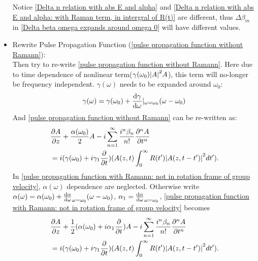 \documentclass[12pt]{extarticle}
\numberwithin{equation}{section}
\numberwithin{figure}{section}
\numberwithin{table}{section}
\newcommand{\<}{\langle}
\renewcommand{\>}{\rangle}
\theoremstyle{definition}
\begin{document}
\begin{itemize}
\begin{equation}
                \end{equation}
                Notice \autoref{Delta n relation with abs E and alpha} and \autoref{Delta n relation with abs E and alpha: with Raman term, in intergral of R(t)} are different, thus $\Delta \beta_m$ in \autoref{Delta beta omega expands around omega 0} will have different values.
            \item Rewrite Pulse Propagation Function (\autoref{pulse propagation function without Ramann}):\\
                Then try to re-write \autoref{pulse propagation function without Ramann}. Here due to time dependence of nonlinear term($\gamma (\omega_0) \abs{A}^2A$), this term will no-longer be frequency independent. $\gamma(\omega)$ needs to be expanded around $\omega_0$:
                \begin{equation}
                    \gamma(\omega)=\gamma(\omega_0)+\dv{\gamma}{\omega}|_{\omega=\omega_0}(\omega-\omega_0)
                \end{equation}
                And \autoref{pulse propagation function without Ramann} can be re-written as:
                \begin{equation}
                \begin{split}
                    &\pdv{A}{z}+\frac{\alpha(\omega_0)}{2}A-i\sum_{n=1}^\infty \frac{i^n \beta_n}{n!}\pdv[n]{A}{t}\\
                    &=i(\gamma(\omega_0)+i\gamma_1\pdv{}{t})(A(z,t)\int_0^\infty R(t^\prime)\abs{A(z,t-t^\prime)}^2dt^\prime ).
                \end{split}
                    \label{pulse propagation function with Ramann: not in rotation frame of group velocity}
                \end{equation}
                In \autoref{pulse propagation function with Ramann: not in rotation frame of group velocity}, $\alpha(\omega)$ dependence are neglected. Otherwise write $\alpha(\omega)=\alpha(\omega_0)+\dv{\alpha}{\omega}_{\omega=\omega_0}(\omega-\omega_0)$, $\alpha_1=\dv{\alpha}{\omega}_{\omega=\omega_0}$, \autoref{pulse propagation function with Ramann: not in rotation frame of group velocity} becomes
                \begin{equation}
                \begin{split}
                    &\pdv{A}{z}+\frac{1}{2}(\alpha(\omega_0)+i\alpha_1\pdv{}{t})A-i\sum_{n=1}^\infty \frac{i^n \beta_n}{n!}\pdv[n]{A}{t}\\
                    &=i(\gamma(\omega_0)+i\gamma_1\pdv{}{t})(A(z,t)\int_0^\infty R(t^\prime)\abs{A(z,t-t^\prime)}^2dt^\prime ).

\end{split}
\end{equation}
\end{itemize}
\end{document}
